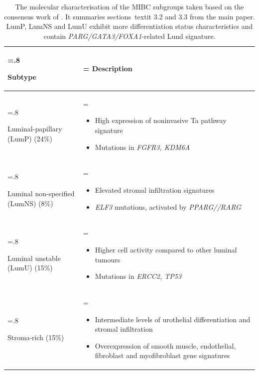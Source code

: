 \begin{table}[htbp]
\centering
\caption{The molecular characterisation of the MIBC subgroups taken based on the consensus work of \cite{Kamoun2020-tj}. It summaries sections\ textit{ 3.2 and 3.3 } from the main paper. LumP, LumNS and LumU exhibit more differentiation status characteristics and contain \textit{PARG/GATA3/FOXA1}-related Lund signature.}
    \begin{tabularx}{\textwidth}{>{\hsize=.8\hsize\raggedright\arraybackslash}X >{\hsize=\hsize\arraybackslash}X}
    \toprule
    Subtype & Description \\
    \midrule
    Luminal-papillary (LumP) (24\%) & 
    \begin{itemize}[leftmargin=*, nosep, after=\vspace{-\baselineskip}]
        \item High expression of noninvasive Ta pathway signature
        \item Mutations in \textit{FGFR3, KDM6A}
    \end{itemize} \\
    \midrule
    Luminal non-specified (LumNS) (8\%) & 
    \begin{itemize}[leftmargin=*, nosep, after=\vspace{-\baselineskip}]
        \item Elevated stromal infiltration signatures
        \item \textit{ELF3} mutations, activated by \textit{PPARG//RARG}
    \end{itemize} \\
    \midrule
    Luminal unstable (LumU) (15\%) & 
    \begin{itemize}[leftmargin=*, nosep, after=\vspace{-\baselineskip}]
        \item Higher cell activity compared to other luminal tumours
        \item Mutations in \textit{ERCC2, TP53}
    \end{itemize} \\
    \midrule
    Stroma-rich (15\%) & 
    \begin{itemize}[leftmargin=*, nosep, after=\vspace{-\baselineskip}]
        \item Intermediate levels of urothelial differentiation and stromal infiltration
        \item Overexpression of smooth muscle, endothelial, fibroblast and myofibroblast gene signatures

\end{itemize}
\end{tabularx}
\end{table}
